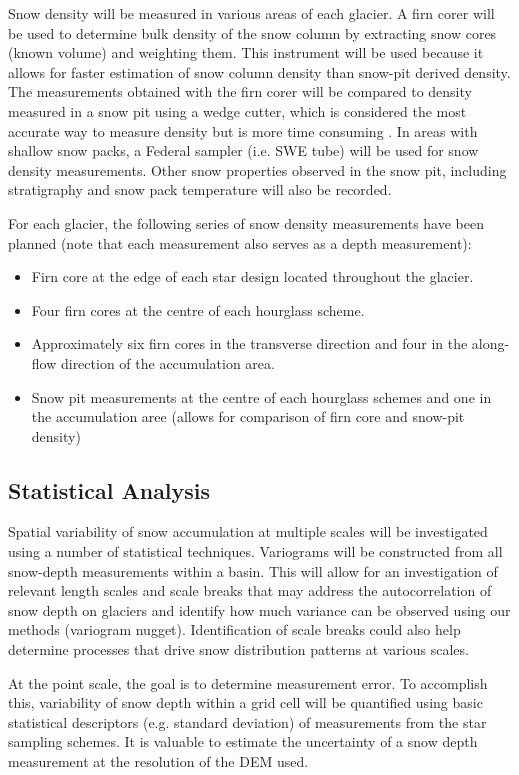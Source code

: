 \documentclass[12pt]{article}
\begin{document}
Snow density will be measured in various areas of each glacier. A firn corer will be used to determine bulk density of the snow column by extracting snow cores (known volume) and weighting them. This instrument will be used because it allows for faster estimation of snow column density than snow-pit derived density. The measurements obtained with the firn corer will be compared to density measured in a snow pit using a wedge cutter, which is considered the most accurate way to measure density but is more time consuming \citep{Ostrem1991}. In areas with shallow snow packs, a Federal sampler (i.e. SWE tube) will be used for snow density measurements. Other snow properties observed in the snow pit, including stratigraphy and snow pack temperature will also be recorded.

For each glacier, the following series of snow density measurements have been planned (note that each measurement also serves as a depth measurement):
\begin{itemize}
\item Firn core at the edge of each star design located throughout the glacier.
\item Four firn cores at the centre of each hourglass scheme.
\item Approximately six firn cores in the transverse direction and four in the along-flow direction of the accumulation area.
\item Snow pit measurements at the centre of each hourglass schemes and one in the accumulation aree (allows for comparison of firn core and snow-pit density)
\end{itemize}

\subsection{Statistical Analysis}

Spatial variability of snow accumulation at multiple scales will be investigated using a number of statistical techniques. Variograms will be constructed from all snow-depth measurements within a basin. This will allow for an investigation of relevant length scales and scale breaks that may address the autocorrelation of snow depth on glaciers and identify how much variance can be observed using our methods (variogram nugget). Identification of scale breaks could also help determine processes that drive snow distribution patterns at various scales. 

At the point scale, the goal is to determine measurement error. To accomplish this, variability of snow depth within a grid cell will be quantified using basic statistical descriptors (e.g. standard deviation) of measurements from the star sampling schemes. It is valuable to estimate the uncertainty of a snow depth measurement at the resolution of the DEM used. 
\end{document}
